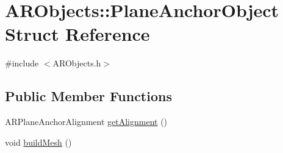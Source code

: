 \hypertarget{struct_a_r_objects_1_1_plane_anchor_object}{}\section{A\+R\+Objects\+:\+:Plane\+Anchor\+Object Struct Reference}
\label{struct_a_r_objects_1_1_plane_anchor_object}


{\ttfamily \#include $<$A\+R\+Objects.\+h$>$}

\subsection*{Public Member Functions}
\begin{DoxyCompactItemize}
\item 
A\+R\+Plane\+Anchor\+Alignment \mbox{\hyperlink{struct_a_r_objects_1_1_plane_anchor_object_af6bf6bb1f2b61e1adbbc82a2cf6e6ed3}{get\+Alignment}} ()
\item 
void \mbox{\hyperlink{struct_a_r_objects_1_1_plane_anchor_object_a12b80e3c39460ed256a85ceab15a4b8b}{build\+Mesh}} ()
\end{DoxyCompactItemize}
